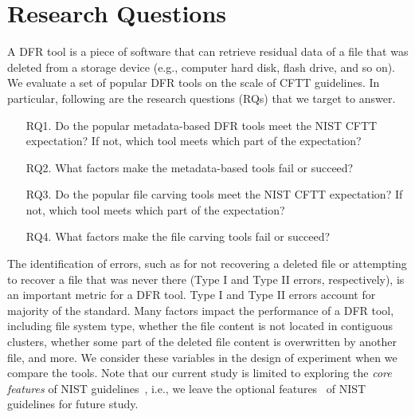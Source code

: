 \section{Research Questions}

\begin{paraphrase}
A DFR tool is a piece of software that can retrieve residual data of a file that was deleted 
from a storage device (e.g., computer hard disk, flash drive, and so on). We evaluate a set of 
popular DFR tools on the scale of CFTT guidelines. 
In particular, following are the research questions (RQs) that we target to answer. 

\begin{itemize}
\item[RQ1.] Do the popular metadata-based DFR tools meet the NIST CFTT expectation? 
If not, which tool meets which part of the expectation? 

\item[RQ2.] What factors make the metadata-based tools fail or succeed?

\item[RQ3.] Do the popular file carving tools meet the NIST CFTT expectation? 
If not, which tool meets which part of the expectation? 

\item[RQ4.] What factors make the file carving tools fail or succeed?

\end{itemize}

The identification of errors, such as for not recovering a deleted file or attempting to recover a file that was never there 
(Type I and Type II errors, respectively), is an important metric for a DFR tool. 
Type I and Type II errors account for majority of the standard. Many factors impact the performance of a DFR tool, 
including file system type, whether the file content is not located in contiguous clusters, whether 
some part of the deleted file content is overwritten by another file, and more.
We consider these variables in the design of experiment when we compare the tools.
Note that our current study is limited to exploring the \emph{core features} of NIST guidelines~\cite{meta:dfr:standards}, 
i.e., we leave the optional features~\cite{meta:dfr:standards} of NIST guidelines for future study. 
\end{paraphrase}


 
